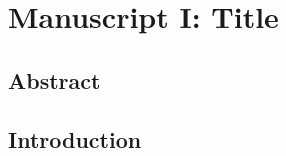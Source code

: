 \setcounter{rownumber}{0}
\singlespacing
\chapter{Manuscript I: Title}
\label{chap:chapterI}
\acresetall


%

%

\doublespacing


\section{Abstract}
\lipsum[2]


\section{Introduction}
\lipsum[2]

